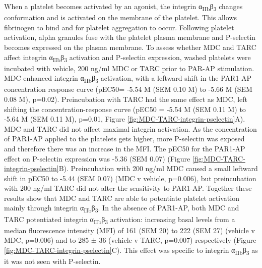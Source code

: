 \documentclass[11pt,twoside]{bristolthesis}
\begin{document}
When a platelet becomes activated by an agonist, the integrin α\textsubscript{IIb}β\textsubscript{3} changes conformation and is activated on the membrane of the platelet. This allows fibrinogen to bind and for platelet aggregation to occur. Following platelet activation, alpha granules fuse with the platelet plasma membrane and P-selectin becomes expressed on the plasma membrane. To assess whether MDC and TARC affect integrin α\textsubscript{IIb}β\textsubscript{3} activation and P-selectin expression, washed platelets were incubated with vehicle, 200 ng/ml MDC or TARC prior to PAR-AP stimulation. MDC enhanced integrin α\textsubscript{IIb}β\textsubscript{3} activation, with a leftward shift in the PAR1-AP concentration response curve (pEC50= -5.54 M (SEM 0.10 M) to -5.66 M (SEM 0.08 M), p=0.02). Preincubation with TARC had the same effect as MDC, left shifting the concentration-response curve (pEC50 = -5.54 M (SEM 0.11 M) to -5.64 M (SEM 0.11 M), p=0.01, Figure \ref{fig:MDC-TARC-integrin-pselectin}A). MDC and TARC did not affect maximal integrin activation. As the concentration of PAR1-AP applied to the platelets gets higher, more P-selectin was exposed and therefore there was an increase in the MFI. The pEC50 for the PAR1-AP effect on P-selectin expression was -5.36 (SEM 0.07) (Figure \ref{fig:MDC-TARC-integrin-pselectin}B). Preincubation with 200 ng/ml MDC caused a small leftward shift in pEC50 to -5.44 (SEM 0.07) (MDC v vehicle, p=0.006), but preincubation with 200 ng/ml TARC did not alter the sensitivity to PAR1-AP. Together these results show that MDC and TARC are able to potentiate platelet activation mainly through integrin α\textsubscript{IIb}β\textsubscript{3}. In the absence of PAR1-AP, both MDC and TARC potentiated integrin α\textsubscript{IIb}β\textsubscript{3} activation: increasing basal levels from a median fluorescence intensity (MFI) of 161 (SEM 20) to 222 (SEM 27) (vehicle v MDC, p=0.006) and to 285 ± 36 (vehicle v TARC, p=0.007) respectively (Figure \ref{fig:MDC-TARC-integrin-pselectin}C). This effect was specific to integrin α\textsubscript{IIb}β\textsubscript{3} as it was not seen with P-selectin.
\end{document}

